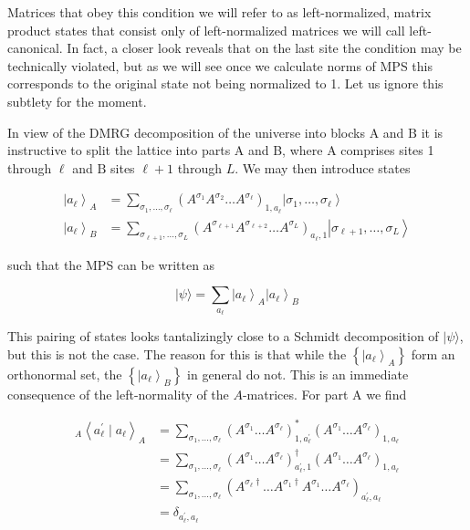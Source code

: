 \documentclass[12pt]{article}
\begin{document}
Matrices that obey this condition we will refer to as left-normalized, matrix product states that consist only of left-normalized matrices we will call left-canonical. In fact, a closer look reveals that on the last site the condition may be technically violated, but as we will see once we calculate norms of MPS this corresponds to the original state not being normalized to 1. Let us ignore this subtlety for the moment.

In view of the DMRG decomposition of the universe into blocks $\mathrm{A}$ and $\mathrm{B}$ it is instructive to split the lattice into parts A and B, where A comprises sites 1 through $\ell$ and $\mathrm{B}$ sites $\ell+1$ through $L$. We may then introduce states


\begin{align*}
\left|a_{\ell}\right\rangle_{A} & =\sum_{\sigma_{1}, \ldots, \sigma_{\ell}}\left(A^{\sigma_{1}} A^{\sigma_{2}} \ldots A^{\sigma_{\ell}}\right)_{1, a_{\ell}}\left|\sigma_{1}, \ldots, \sigma_{\ell}\right\rangle  \tag{39}\\
\left|a_{\ell}\right\rangle_{B} & =\sum_{\sigma_{\ell+1}, \ldots, \sigma_{L}}\left(A^{\sigma_{\ell+1}} A^{\sigma_{\ell+2}} \ldots A^{\sigma_{L}}\right)_{a_{\ell}, 1}\left|\sigma_{\ell+1}, \ldots, \sigma_{L}\right\rangle \tag{40}
\end{align*}


such that the MPS can be written as


\begin{equation*}
|\psi\rangle=\sum_{a_{\ell}}\left|a_{\ell}\right\rangle_{A}\left|a_{\ell}\right\rangle_{B} \tag{41}
\end{equation*}


This pairing of states looks tantalizingly close to a Schmidt decomposition of $|\psi\rangle$, but this is not the case. The reason for this is that while the $\left\{\left|a_{\ell}\right\rangle_{A}\right\}$ form an orthonormal set, the $\left\{\left|a_{\ell}\right\rangle_{B}\right\}$ in general do not. This is an immediate consequence of the left-normality of the $A$-matrices. For part A we find

$$
\begin{aligned}
{ }_{A}\left\langle a_{\ell}^{\prime} \mid a_{\ell}\right\rangle_{A} & =\sum_{\sigma_{1}, \ldots, \sigma_{\ell}}\left(A^{\sigma_{1}} \ldots A^{\sigma_{\ell}}\right)_{1, a_{\ell}^{\prime}}^{*}\left(A^{\sigma_{1}} \ldots A^{\sigma_{\ell}}\right)_{1, a_{\ell}} \\
& =\sum_{\sigma_{1}, \ldots, \sigma_{\ell}}\left(A^{\sigma_{1}} \ldots A^{\sigma_{\ell}}\right)_{a_{\ell}^{\prime}, 1}^{\dagger}\left(A^{\sigma_{1}} \ldots A^{\sigma_{\ell}}\right)_{1, a_{\ell}} \\
& =\sum_{\sigma_{1}, \ldots, \sigma_{\ell}}\left(A^{\sigma_{\ell} \dagger} \ldots A^{\sigma_{1} \dagger} A^{\sigma_{1}} \ldots A^{\sigma_{\ell}}\right)_{a_{\ell}^{\prime}, a_{\ell}} \\
& =\delta_{a_{\ell}^{\prime}, a_{\ell}}
\end{aligned}
$$
\end{document}
